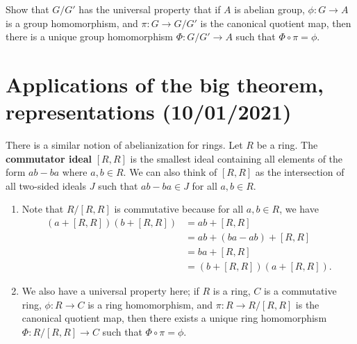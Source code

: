 \begin{exercise}{}
    Show that $G/G'$ has the universal property that if $A$ is abelian 
    group, $\phi : G \to A$ is a group homomorphism, and $\pi 
    : G \to G/G'$ is the canonical quotient map, then there is a 
    unique group homomorphism $\Phi : G/G' \to A$ such that 
    $\Phi \circ \pi = \phi$. 

    \begin{center}
    \end{center}
\end{exercise}

\section{Applications of the big theorem, representations (10/01/2021)}
There is a similar notion of abelianization for rings. Let $R$ 
be a ring. The {\bf commutator ideal} $[R, R]$ is the smallest ideal 
containing all elements of the form $ab - ba$ where $a, b \in R$. 
We can also think of $[R, R]$ as the intersection of all two-sided ideals 
$J$ such that $ab - ba \in J$ for all $a, b \in R$. 

\begin{remark}{}
    \begin{enumerate}[(1)]
        \item Note that $R/[R, R]$ is commutative because for all $a, b \in R$, 
        we have 
        \begin{align*}
            (a + [R, R])(b + [R, R]) 
            &= ab + [R, R] \\ 
            &= ab + (ba - ab) + [R, R] \\
            &= ba + [R, R] \\
            &= (b + [R, R])(a + [R, R]).
        \end{align*}
        \item We also have a universal property here; if $R$ is a ring, 
        $C$ is a commutative ring, $\phi : R \to C$ is a ring homomorphism, 
        and $\pi : R \to R/[R, R]$ is the canonical quotient map, then 
        there exists a unique ring homomorphism $\Phi : R/[R, R] \to C$ 
        such that $\Phi \circ \pi = \phi$. 
        \begin{center}
        \end{center}
    \end{enumerate}
\end{remark}

